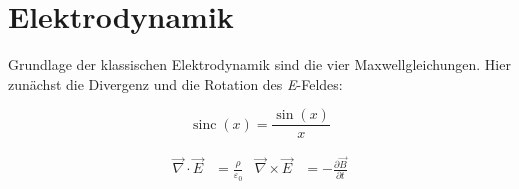 \documentclass{scrartcl}
\DeclareMathOperator*{\sinc}{sinc}
\begin{document}
	\section{Elektrodynamik}
	Grundlage der klassischen Elektrodynamik sind die vier Maxwellgleichungen. Hier zunächst die Divergenz und die Rotation des \textit{E}-Feldes:
	
	\[
	
	\sinc(x) = \frac{\sin(x)}{x}
	
	\]
	
	\begin{align}
	
	\vec{\nabla} \cdot \vec{E} &= \frac{\rho}{\varepsilon_0} & \vec{\nabla} \times\vec{E} &= - \frac{\partial \vec{B}}{\partial t}
	
	\end{align}
	
\end{document}
